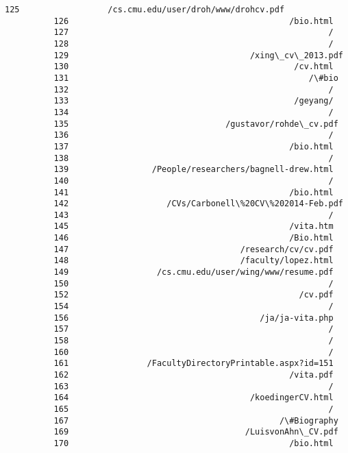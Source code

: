\documentclass[11pt]{article}
\begin{document}
\begin{Verbatim}[commandchars=\\\{\}]
          125                  /cs.cmu.edu/user/droh/www/drohcv.pdf
          126                                             /bio.html
          127                                                     /
          128                                                     /
          129                                     /xing\_cv\_2013.pdf
          130                                              /cv.html
          131                                                 /\#bio
          132                                                     /
          133                                              /geyang/
          134                                                     /
          135                                /gustavor/rohde\_cv.pdf
          136                                                     /
          137                                             /bio.html
          138                                                     /
          139                 /People/researchers/bagnell-drew.html
          140                                                     /
          141                                             /bio.html
          142                    /CVs/Carbonell\%20CV\%202014-Feb.pdf
          143                                                     /
          145                                             /vita.htm
          146                                             /Bio.html
          147                                   /research/cv/cv.pdf
          148                                   /faculty/lopez.html
          149                  /cs.cmu.edu/user/wing/www/resume.pdf
          150                                                     /
          152                                               /cv.pdf
          154                                                     /
          156                                       /ja/ja-vita.php
          157                                                     /
          158                                                     /
          160                                                     /
          161                /FacultyDirectoryPrintable.aspx?id=151
          162                                             /vita.pdf
          163                                                     /
          164                                     /koedingerCV.html
          165                                                     /
          167                                           /\#Biography
          169                                    /LuisvonAhn\_CV.pdf
          170                                             /bio.html

\end{Verbatim}
\end{document}
